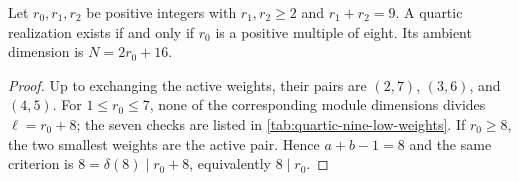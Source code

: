 \begin{corollary}
\label{cor:quartic-nine-weights}
Let $r_0,r_1,r_2$ be positive integers with $r_1,r_2\geq2$ and
$r_1+r_2=9$. A quartic realization exists if and only if $r_0$ is
a positive multiple of eight. Its ambient dimension is $N=2r_0+16$.
\end{corollary}

\begin{proof}
Up to exchanging the active weights, their pairs are $(2,7)$,
$(3,6)$, and $(4,5)$. For $1\leq r_0\leq7$, none of the corresponding module
dimensions divides $\ell=r_0+8$; the seven checks are listed in
\cref{tab:quartic-nine-low-weights}.
If $r_0\geq8$, the two
smallest weights are the active pair. Hence $a+b-1=8$ and the same
criterion is $8=\delta(8)\mid r_0+8$, equivalently $8\mid r_0$.
\end{proof}

